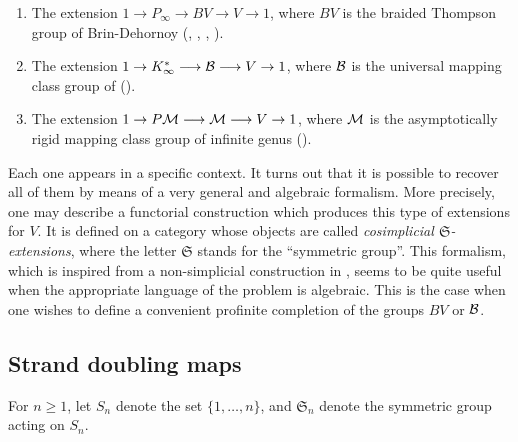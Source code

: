 \documentclass[twoside]{irmaems}
\theoremstyle{plain}
\theoremstyle{definition}
\theoremstyle{remark}
\newcommand{\B}{{{\cal B}}}
\begin{document}
\begin{enumerate}
\item The extension $1\rightarrow P_{\infty}\longrightarrow BV\longrightarrow V\rightarrow 1$, where $BV$ is 
the braided Thompson group of Brin-Dehornoy (\cite{bri1}, \cite{bri2}, \cite{de1}, \cite{de2}).
\item The extension $1\rightarrow K^*_{\infty}\longrightarrow \B\longrightarrow V\rightarrow 1$, where 
$\B$ is the universal mapping class group of (\cite{fu-ka1}).
\item The extension  $1\rightarrow P{\cal M}\longrightarrow {\cal M}\longrightarrow V\rightarrow 1$, where
${\cal M}$ is the asymptotically rigid mapping class group of infinite genus (\cite{fu-ka3}).
\end{enumerate}
Each one appears in a specific context. It turns out that it is possible to recover all of them by means of a very general and algebraic formalism. More precisely, one may describe 
a functorial construction which produces this type of extensions for $V$. It is defined on a category 
whose objects are called  {\em cosimplicial $\mathfrak{S}$-extensions}, 
where the letter $\mathfrak{S}$ stands for the  ``symmetric group''. 
This formalism, which is inspired from a non-simplicial construction in 
\cite{FiLo}, seems to be 
quite useful when the appropriate language of the problem is algebraic. This is the case when one wishes to define a convenient profinite completion 
of the groups $BV$ or $\B$. 


\subsection{Strand doubling maps}

For $n\geq1$, let $S_n$ denote the set $\{1,\ldots,n\}$, and $\mathfrak S_{n}$ denote the symmetric group acting on $S_n$. 
\end{document}
